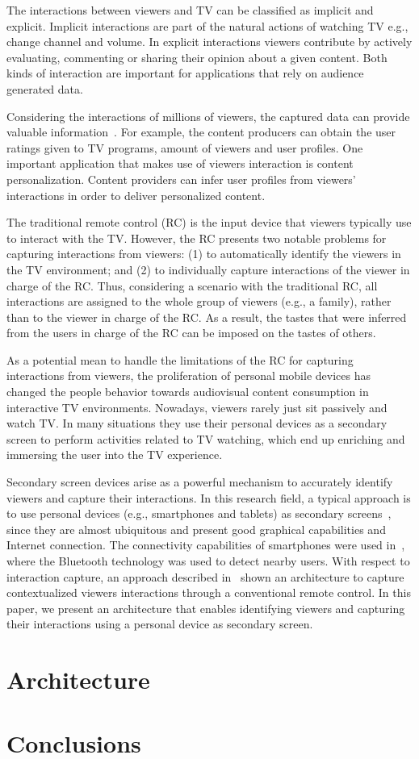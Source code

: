 \documentclass[conference,a4paper]{IEEEtran}
\begin{document}
The interactions between viewers and TV can be classified as implicit and explicit. Implicit interactions are part of the natural actions of watching TV e.g., change channel and volume. In explicit interactions viewers contribute by actively evaluating, commenting or sharing their opinion about a given content. Both kinds of interaction are important for applications that rely on audience generated data.

Considering the interactions of millions of viewers, the captured data can provide valuable information~\cite{Teixeira2010}. For example, the content producers can obtain the user ratings given to TV programs, amount of viewers and user profiles. One important application that makes use of viewers interaction is content personalization. Content providers can infer user profiles from viewers' interactions in order to deliver personalized content.

The traditional remote control (RC) is the input device that viewers typically use to interact with the TV. However, the RC presents two notable problems for capturing interactions from viewers: (1) to automatically identify the viewers in the TV environment; and (2) to individually capture interactions of the viewer in charge of the RC. Thus, considering a scenario with the traditional RC, all interactions are assigned to the whole group of viewers (e.g., a family), rather than to the viewer in charge of the RC. As a result, the tastes that were inferred from the users in charge of the RC can be imposed on the tastes of others.

As a potential mean to handle the limitations of the RC for capturing interactions from viewers, the proliferation of personal mobile devices has changed the people behavior towards audiovisual content consumption in interactive TV environments. Nowadays, viewers rarely just sit passively and watch TV. In many situations they use their personal devices as a secondary screen to perform activities related to TV watching, which end up enriching and immersing the user into the TV experience. 

Secondary screen devices arise as a powerful mechanism to accurately identify viewers and  capture their interactions. In this research field, a typical approach is to use personal devices (e.g., smartphones and tablets) as secondary screens~\cite{Courtois2012}, since they are almost ubiquitous and present good graphical capabilities and Internet connection. The connectivity capabilities of smartphones were used in~\cite{Cabarcos2011}, where the Bluetooth technology was used to detect nearby users. With respect to interaction capture, an approach described in~\cite{Teixeira2010} shown an architecture to capture contextualized viewers interactions through a conventional remote control. In this paper, we present an architecture that enables identifying viewers and capturing their interactions using a personal device as secondary screen. 

\section{Architecture}



\section{Conclusions}





\end{document}
